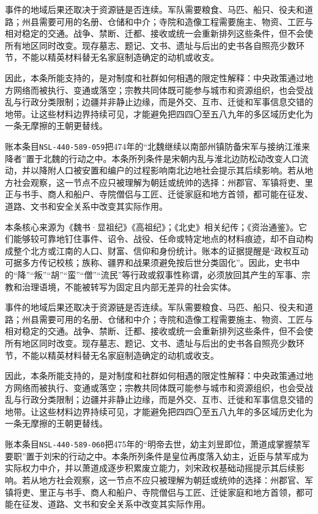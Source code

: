 事件的地域后果还取决于资源链是否连续。军队需要粮食、马匹、船只、役夫和道路；州县需要可用的名册、仓储和中介；寺院和造像工程需要施主、物资、工匠与相对稳定的交通。战争、禁断、迁都、接收或统一会重新排列这些条件，但不会使所有地区同时改变。现存墓志、题记、文书、遗址与后出的史书各自照亮少数环节，不能以精英材料替无名家庭制造确定的动机或收支。

因此，本条所能支持的，是对制度和社群如何相遇的限定性解释：中央政策通过地方网络而被执行、变通或落空；宗教共同体既可能参与城市和资源组织，也会受战乱与行政分类限制；边疆并非静止边缘，而是外交、互市、迁徙和军事信息交错的地带。让这些材料边界持续可见，才能避免把四四〇至五八九年的多区域历史化为一条无摩擦的王朝更替线。

账本条目\texttt{NSL-440-589-059}把474年的“北魏继续以南部州镇防备宋军与接纳江淮来降者”置于北魏的行动之中。本条所列条件是宋朝内乱与淮北边防松动改变人口流动，并以降附人口被安置和编户的过程影响南北边地社会提示其后续影响。若从地方社会观察，这一节点不应只被理解为朝廷或统帅的选择：州郡官、军镇将吏、里正与书手、商人和船户、寺院僧侣与工匠、迁徙家庭和地方首领，都可能在征发、道路、文书和安全关系中改变其实际作用。

本条核心来源为《魏书·显祖纪》《高祖纪》；《北史》相关纪传；《资治通鉴》。它们能够较可靠地钉住事件、诏令、战役、任命或特定地点的材料痕迹，却不自动构成整个北方或江南的人口、财富、信仰和身份统计。账本的证据提醒是“政权互动可据多方传记校核；族称、疆界和战果须避免按后世分类固化”。因此，史书中的“降”“叛”“胡”“蛮”“僧”“流民”等行政或叙事性称谓，必须放回其产生的军事、宗教和治理语境，不能被转写为固定且内部无差异的社会实体。

事件的地域后果还取决于资源链是否连续。军队需要粮食、马匹、船只、役夫和道路；州县需要可用的名册、仓储和中介；寺院和造像工程需要施主、物资、工匠与相对稳定的交通。战争、禁断、迁都、接收或统一会重新排列这些条件，但不会使所有地区同时改变。现存墓志、题记、文书、遗址与后出的史书各自照亮少数环节，不能以精英材料替无名家庭制造确定的动机或收支。

因此，本条所能支持的，是对制度和社群如何相遇的限定性解释：中央政策通过地方网络而被执行、变通或落空；宗教共同体既可能参与城市和资源组织，也会受战乱与行政分类限制；边疆并非静止边缘，而是外交、互市、迁徙和军事信息交错的地带。让这些材料边界持续可见，才能避免把四四〇至五八九年的多区域历史化为一条无摩擦的王朝更替线。

账本条目\texttt{NSL-440-589-060}把475年的“明帝去世，幼主刘昱即位，萧道成掌握禁军要职”置于刘宋的行动之中。本条所列条件是皇位再度落入幼主，近臣与禁军成为实际权力中介，并以萧道成逐步积累废立能力，刘宋政权基础动摇提示其后续影响。若从地方社会观察，这一节点不应只被理解为朝廷或统帅的选择：州郡官、军镇将吏、里正与书手、商人和船户、寺院僧侣与工匠、迁徙家庭和地方首领，都可能在征发、道路、文书和安全关系中改变其实际作用。

